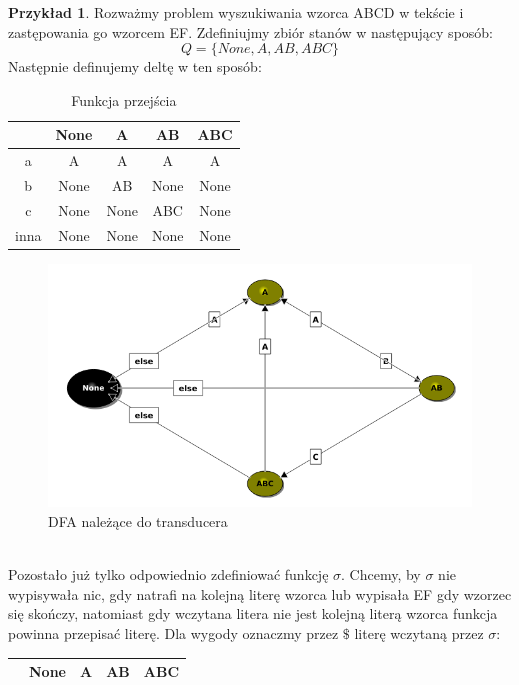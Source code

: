\documentclass[declaration,shortabstract]{iithesis}
\theoremstyle{definition}
\newtheorem{exmp}{Przykład}[section]
\theoremstyle{plain}
\begin{document}
\begin{exmp}
Rozważmy problem wyszukiwania wzorca ABCD w tekście i zastępowania go wzorcem EF. Zdefiniujmy zbiór stanów w następujący sposób:
$$ Q = \{None, A, AB, ABC\} $$ 
Następnie definujemy deltę w ten sposób:
\begin{table}[h]
    \centering
    \begin{tabular}{|c||c | c | c| c|}
        \hline       
          & None & A & AB & ABC \\ \hline \hline 
        a & A    & A & A  & A \\ \hline
        b & None & AB & None & None \\ \hline
        c & None & None & ABC & None \\ \hline
        inna & None & None & None & None\\  \hline
    \end{tabular} 
    \caption{Funkcja przejścia}
    \label{tab:my_label}
\end{table}
\begin{figure}[h]
\centering
\includegraphics[width=\textwidth]{abc.png}
\caption{DFA należące do transducera}
\label{fig:abc}
\end{figure} \\
Pozostało już tylko odpowiednio zdefiniować funkcję \(\sigma\). Chcemy, by \(\sigma\) nie wypisywała nic, gdy natrafi na kolejną literę wzorca lub wypisała EF gdy wzorzec się skończy, natomiast gdy wczytana litera nie jest kolejną literą wzorca funkcja powinna przepisać literę. Dla wygody oznaczmy przez \(\$\) literę wczytaną przez \(\sigma\):\\
\begin{table}[h]
    \centering
    \begin{tabular}{|c||c | c | c| c|}
        \hline       
          & None & A & AB & ABC \\ \hline \hline 

\end{tabular}
\end{table}
\end{exmp}
\end{document}
